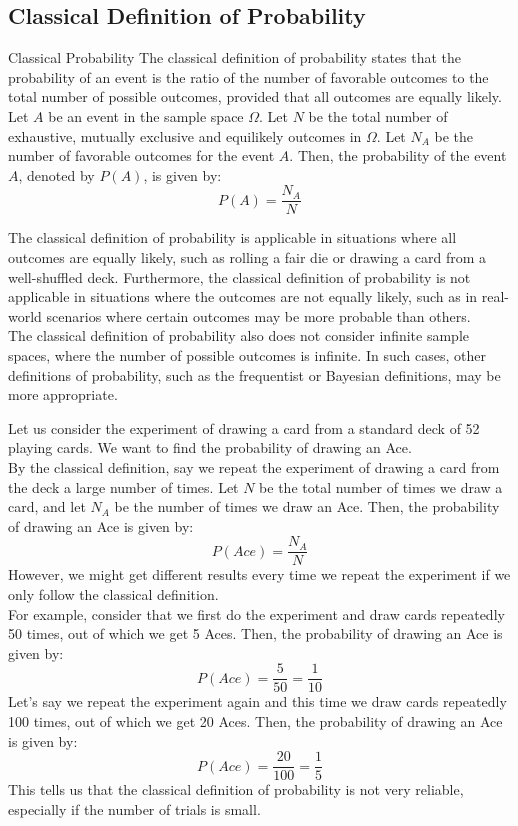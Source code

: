\documentclass[openany]{book}
\begin{document}
\subsection{Classical Definition of Probability}
\begin{mydefinition}{Classical Probability}
The classical definition of probability states that the probability of an event is the ratio of the number of favorable outcomes to the total number of possible outcomes, provided that all outcomes are equally likely. \\
Let $A$ be an event in the sample space $\Omega$. Let $N$ be the total number of exhaustive, mutually exclusive and equilikely outcomes in $\Omega$. Let $N_A$ be the number of favorable outcomes for the event $A$. Then, the probability of the event $A$, denoted by $P(A)$, is given by:
$$P(A) = \frac{N_A}{N}$$
\end{mydefinition}
\begin{mynote}
The classical definition of probability is applicable in situations where all outcomes are equally likely, such as rolling a fair die or drawing a card from a well-shuffled deck. Furthermore, the classical definition of probability is not applicable in situations where the outcomes are not equally likely, such as in real-world scenarios where certain outcomes may be more probable than others. \\
The classical definition of probability also does not consider infinite sample spaces, where the number of possible outcomes is infinite. In such cases, other definitions of probability, such as the frequentist or Bayesian definitions, may be more appropriate.
\end{mynote}
\begin{example}
    Let us consider the experiment of drawing a card from a standard deck of 52 playing cards. We want to find the probability of drawing an Ace. \\
    By the classical definition, say we repeat the experiment of drawing a card from the deck a large number of times. Let $N$ be the total number of times we draw a card, and let $N_A$ be the number of times we draw an Ace. Then, the probability of drawing an Ace is given by:
    $$P(Ace) = \frac{N_A}{N}$$
    However, we might get different results every time we repeat the experiment if we only follow the classical definition. \\ 
    For example, consider that we first do the experiment and draw cards repeatedly 50 times, out of which we get 5 Aces. Then, the probability of drawing an Ace is given by:
    $$P(Ace) = \frac{5}{50} = \frac{1}{10}$$
    Let's say we repeat the experiment again and this time we draw cards repeatedly 100 times, out of which we get 20 Aces. Then, the probability of drawing an Ace is given by:
    $$P(Ace) = \frac{20}{100} = \frac{1}{5}$$
    This tells us that the classical definition of probability is not very reliable, especially if the number of trials is small.
\end{example}
\end{document}

